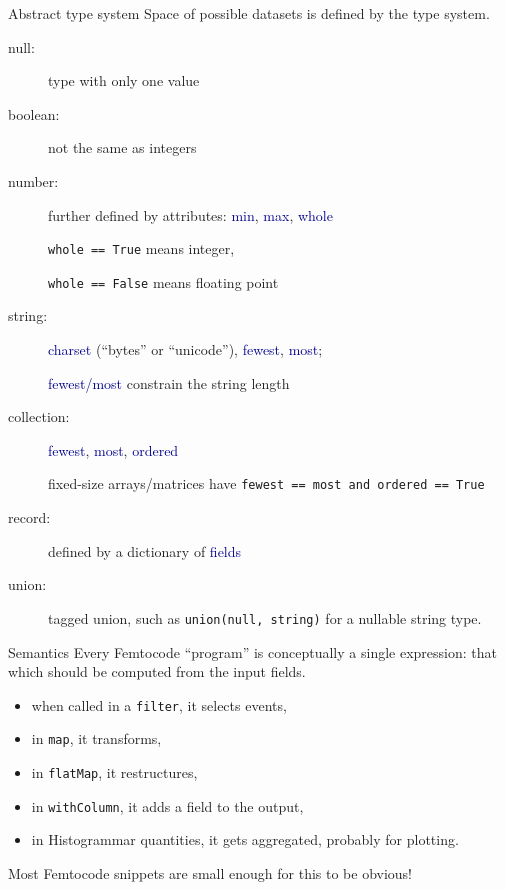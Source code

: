 \documentclass{beamer}
\begin{document}
\begin{frame}{Abstract type system}
\vspace{0.5 cm}
Space of possible datasets is defined by the type system.

\begin{description}
\item[null:] type with only one value
\item[boolean:] not the same as integers
\item[number:] further defined by attributes: \textcolor{darkblue}{min}, \textcolor{darkblue}{max}, \textcolor{darkblue}{whole}

{\tt whole == True} means integer,

{\tt whole == False} means floating point

\item[string:] \textcolor{darkblue}{charset} (``bytes'' or ``unicode''), \textcolor{darkblue}{fewest}, \textcolor{darkblue}{most};

\textcolor{darkblue}{fewest/most} constrain the string length

\item[collection:] \textcolor{darkblue}{fewest}, \textcolor{darkblue}{most}, \textcolor{darkblue}{ordered}

fixed-size arrays/matrices have {\tt fewest == most and ordered == True}

\item[record:] defined by a dictionary of \textcolor{darkblue}{fields}
\item[union:] tagged union, such as {\tt union(null, string)} for a nullable string type.
\end{description}
\end{frame}

\begin{frame}{Semantics}
Every Femtocode ``program'' is conceptually a single expression: that which should be computed from the input fields.
\begin{itemize}
\item when called in a {\tt filter}, it selects events,
\item in {\tt map}, it transforms,
\item in {\tt flatMap}, it restructures,
\item in {\tt withColumn}, it adds a field to the output,
\item in Histogrammar quantities, it gets aggregated, probably for plotting.
\end{itemize}

\vspace{0.5 cm}
Most Femtocode snippets are small enough for this to be obvious!
\end{frame}
\end{document}
